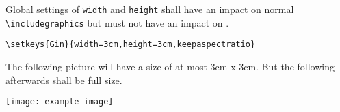 \documentclass[a4paper,\myClassOptions]{article}
\begin{document}
\Large

Global settings of \verb|width| and \verb|height| shall have an
impact on normal \verb|\includegraphics| but must not have an impact
on \verb||.

\verb|\setkeys{Gin}{width=3cm,height=3cm,keepaspectratio}|

The following picture will have a size of at most 3cm x 3cm.
But the \verb|| following afterwards shall be full size.


\vspace*{\bigskipamount}
\texttt{[image: example-image]}




\end{document}
